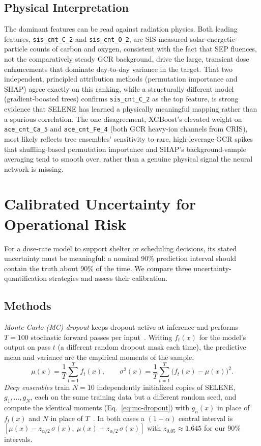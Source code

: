 \documentclass[graybox]{SNmult}
\begin{document}
\subsection{Physical Interpretation}
The dominant features can be read against radiation physics. Both leading
features, \texttt{sis\_cnt\_C\_2} and \texttt{sis\_cnt\_O\_2}, are SIS-measured
solar-energetic-particle counts of carbon and oxygen, consistent with the fact
that SEP fluences, not the comparatively steady GCR background, drive the
large, transient dose enhancements that dominate day-to-day variance in the
target. That two independent, principled attribution methods (permutation
importance and SHAP) agree exactly on this ranking, while a structurally
different model (gradient-boosted trees) confirms \texttt{sis\_cnt\_C\_2} as the
top feature, is strong evidence that SELENE has learned a physically meaningful
mapping rather than a spurious correlation. The one disagreement, XGBoost's
elevated weight on \texttt{ace\_cnt\_Ca\_5} and \texttt{ace\_cnt\_Fe\_4} (both GCR
heavy-ion channels from CRIS), most likely reflects tree ensembles' sensitivity
to rare, high-leverage GCR spikes that shuffling-based permutation importance
and SHAP's background-sample averaging tend to smooth over, rather than a
genuine physical signal the neural network is missing.

\section{Calibrated Uncertainty for Operational Risk}
\label{sec:calib}

For a dose-rate model to support shelter or scheduling decisions, its stated
uncertainty must be meaningful: a nominal 90\% prediction interval should contain
the truth about 90\% of the time. We compare three uncertainty-quantification
strategies and assess their calibration.

\subsection{Methods}
\emph{Monte Carlo (MC) dropout} keeps dropout active at inference and performs
$T=100$ stochastic forward passes per input~\cite{gal2016dropout}. Writing
$f_t(x)$ for the model's output on pass $t$ (a different random dropout mask
each time), the predictive mean and variance are the empirical moments of the
sample,
\begin{equation}
  \mu(x) = \frac{1}{T}\sum_{t=1}^{T} f_t(x), \qquad
  \sigma^2(x) = \frac{1}{T}\sum_{t=1}^{T} \bigl(f_t(x) - \mu(x)\bigr)^2.
  \label{eq:mc-dropout}
\end{equation}
\emph{Deep ensembles} train $N=10$ independently initialized copies of SELENE,
$g_1,\dots,g_N$, each on the same training data but a different random seed, and
compute the identical moments (Eq.~\ref{eq:mc-dropout}) with $g_n(x)$ in
place of $f_t(x)$ and $N$ in place of
$T$~\cite{lakshminarayanan2017ensembles}. In both cases a $(1-\alpha)$ central
interval is $[\mu(x) - z_{\alpha/2}\,\sigma(x),\ \mu(x) + z_{\alpha/2}\,\sigma(x)]$
with $z_{0.05} \approx 1.645$ for our $90\%$ intervals.
\end{document}
